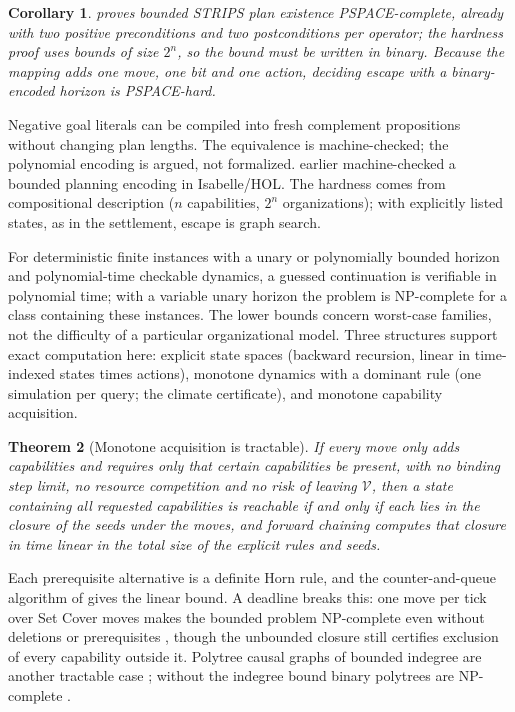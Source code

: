 \documentclass[11pt]{article}
\theoremstyle{plain}
\newtheorem{theorem}{Theorem}
\newtheorem{corollary}[theorem]{Corollary}
\theoremstyle{definition}
\newcommand{\V}{\mathcal{V}}
\begin{document}
\begin{corollary}\label{cor:pspace}
\citet[Theorem~4.1]{Bylander1994} proves bounded STRIPS plan existence PSPACE-complete, already with two positive preconditions and two postconditions per operator; the hardness proof uses bounds of size $2^n$, so the bound must be written in binary. Because the mapping adds one move, one bit and one action, deciding escape with a binary-encoded horizon is PSPACE-hard.
\end{corollary}

Negative goal literals can be compiled into fresh complement propositions without changing plan lengths. The equivalence is machine-checked; the polynomial encoding is argued, not formalized. \citet{AbdulazizKurz2023} earlier machine-checked a bounded planning encoding in Isabelle/HOL. The hardness comes from compositional description ($n$ capabilities, $2^n$ organizations); with explicitly listed states, as in the settlement, escape is graph search.

For deterministic finite instances with a unary or polynomially bounded horizon and polynomial-time checkable dynamics, a guessed continuation is verifiable in polynomial time; with a variable unary horizon the problem is NP-complete for a class containing these instances. The lower bounds concern worst-case families, not the difficulty of a particular organizational model. Three structures support exact computation here: explicit state spaces (backward recursion, linear in time-indexed states times actions), monotone dynamics with a dominant rule (one simulation per query; the climate certificate), and monotone capability acquisition.

\begin{theorem}[Monotone acquisition is tractable]\label{thm:horn}
If every move only adds capabilities and requires only that certain capabilities be present, with no binding step limit, no resource competition and no risk of leaving $\V$, then a state containing all requested capabilities is reachable if and only if each lies in the closure of the seeds under the moves, and forward chaining computes that closure in time linear in the total size of the explicit rules and seeds.
\end{theorem}

Each prerequisite alternative is a definite Horn rule, and the counter-and-queue algorithm of \citet{DowlingGallier1984} gives the linear bound. A deadline breaks this: one move per tick over Set Cover moves makes the bounded problem NP-complete even without deletions or prerequisites \citep{Karp1972}, though the unbounded closure still certifies exclusion of every capability outside it. Polytree causal graphs of bounded indegree are another tractable case \citep{BrafmanDomshlak2003}; without the indegree bound binary polytrees are NP-complete \citep[Theorem~6.3]{GimenezJonsson2008}.
\end{document}
